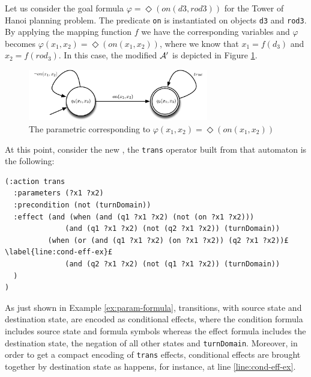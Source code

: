 \begin{example}\label{ex:param-formula}
Let us consider the goal formula $\varphi = \Diamond(on(d3,rod3))$ for the Tower of Hanoi planning problem. The predicate \texttt{on} is instantiated on objects \texttt{d3} and \texttt{rod3}. By applying the mapping function $f$ we have the corresponding variables and $\varphi$ becomes $\varphi(x_1,x_2) = \Diamond(on(x_1,x_2))$, where we know that $x_1 = f(d_3)$ and  $x_2 = f(rod_3)$. In this case, the modified \DFA $\mathcal{A}'$ is depicted in Figure \ref{fig:dfa-parametric}.
\begin{figure}[h]
\centering
\includegraphics[width=0.7\textwidth]{images/automa-param}
\caption{The parametric \DFA corresponding to $\varphi(x_1,x_2) = \Diamond(on(x_1,x_2))$} 
\label{fig:dfa-parametric}
\end{figure}
At this point, consider the new \DFA, the \texttt{trans} operator built from that automaton is the following:
\begin{lstlisting}[language=PDDL, escapechar=£]
(:action trans
  :parameters (?x1 ?x2)
  :precondition (not (turnDomain))
  :effect (and (when (and (q1 ?x1 ?x2) (not (on ?x1 ?x2)))
              (and (q1 ?x1 ?x2) (not (q2 ?x1 ?x2)) (turnDomain))
          (when (or (and (q1 ?x1 ?x2) (on ?x1 ?x2)) (q2 ?x1 ?x2))£\label{line:cond-eff-ex}£
              (and (q2 ?x1 ?x2) (not (q1 ?x1 ?x2)) (turnDomain))
  )
)
\end{lstlisting}
\end{example}

As just shown in Example \ref{ex:param-formula}, transitions, with source state and destination state, are encoded as conditional effects, where the condition formula includes source state and formula symbols whereas the effect formula includes the destination state, the negation of all other states and \texttt{turnDomain}. Moreover, in order to get a compact encoding of \texttt{trans} effects, conditional effects are brought together by destination state as happens, for instance, at line \ref{line:cond-eff-ex}.

